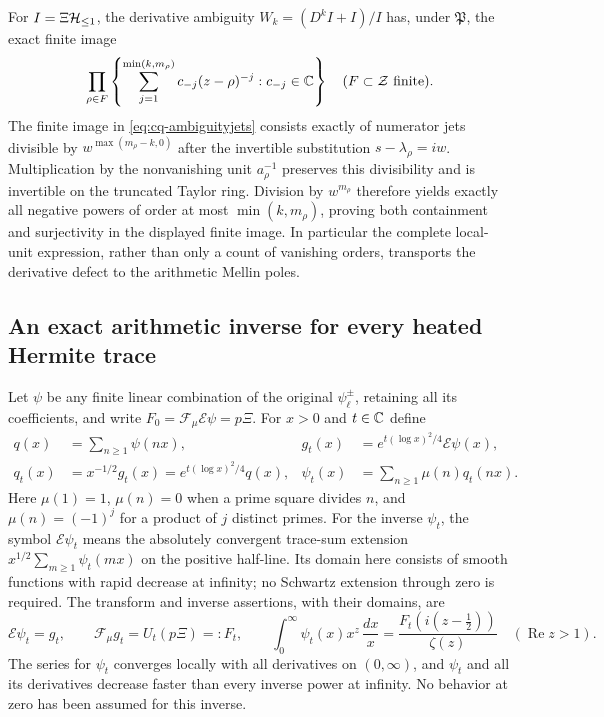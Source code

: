 For $I=\Xi\mathcal H_{\leq 1}$, the derivative ambiguity
$W_k=(D^kI+I)/I$ has, under $\mathfrak P$, the exact finite image
\begin{equation}\label{eq:cq-principal-ambiguity}
 \prod_{\rho\in F}
 \left\{\sum_{j=1}^{\min(k,m_\rho)}c_{-j}(z-\rho)^{-j}:c_{-j}\in\mathbb C\right\}
 \quad(F\subset\mathcal Z\text{ finite}).
\end{equation}
The finite image in \eqref{eq:cq-ambiguityjets} consists exactly
of numerator jets divisible by $w^{\max(m_\rho-k,0)}$ after
the invertible substitution $s-\lambda_\rho=iw$.
Multiplication by the nonvanishing unit $a_\rho^{-1}$ preserves
this divisibility and is invertible on the truncated Taylor ring.
Division by $w^{m_\rho}$ therefore yields exactly all negative
powers of order at most $\min(k,m_\rho)$, proving both
containment and surjectivity in the displayed finite image.
In particular the complete local-unit expression, rather than only
a count of vanishing orders, transports the derivative defect to
the arithmetic Mellin poles.

\subsection{An exact arithmetic inverse for every heated Hermite trace}
\label{sec:cq-moebius}
Let $\psi$ be any finite linear combination of the original
$\psi_\ell^\pm$, retaining all its coefficients, and write
$F_0=\mathcal F_\mu\mathcal E\psi=p\Xi$. For $x>0$ and
$t\in\mathbb C$ define
\begin{equation}\label{eq:cq-moebius-data}
 \begin{aligned}
 q(x)&=\sum_{n\geq1}\psi(nx),&
 g_t(x)&=e^{t(\log x)^2/4}\mathcal E\psi(x),\\
 q_t(x)&=x^{-1/2}g_t(x)=e^{t(\log x)^2/4}q(x),&
 \psi_t(x)&=\sum_{n\geq1}\mu(n)q_t(nx).
 \end{aligned}
\end{equation}
Here $\mu(1)=1$, $\mu(n)=0$ when a prime square divides $n$,
and $\mu(n)=(-1)^j$ for a product of $j$ distinct primes.
For the inverse $\psi_t$, the symbol $\mathcal E\psi_t$ means
the absolutely convergent trace-sum extension
$x^{1/2}\sum_{m\geq1}\psi_t(mx)$ on the positive half-line.
Its domain here consists of smooth functions with rapid decrease
at infinity; no Schwartz extension through zero is required.
The transform and inverse assertions, with their domains, are
\begin{equation}\label{eq:cq-moebius-inverse}
 \mathcal E\psi_t=g_t,\qquad
 \mathcal F_\mu g_t=U_t(p\Xi)=:F_t,\qquad
 \int_0^\infty\psi_t(x)x^z\,\frac{dx}{x}
       =\frac{F_t(i(z-\tfrac12))}{\zeta(z)}
       \quad(\operatorname{Re}z>1).
\end{equation}
The series for $\psi_t$ converges locally with all derivatives on
$(0,\infty)$, and $\psi_t$ and all its derivatives decrease faster
than every inverse power at infinity. No behavior at zero has been
assumed for this inverse.

